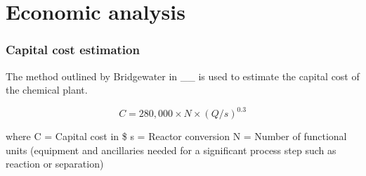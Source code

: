 
\section{Economic analysis}
\label{app:economics}
\subsubsection{Capital cost estimation}

The method outlined by Bridgewater in __ is used to estimate the capital cost of the chemical plant. 

\begin{equation}
    C=280,000 \times N \times (Q/s)^0.3
\end{equation}

where C = Capital cost in \$
s = Reactor conversion
N = Number of functional units (equipment and ancillaries needed for a significant process step such as reaction or separation)
